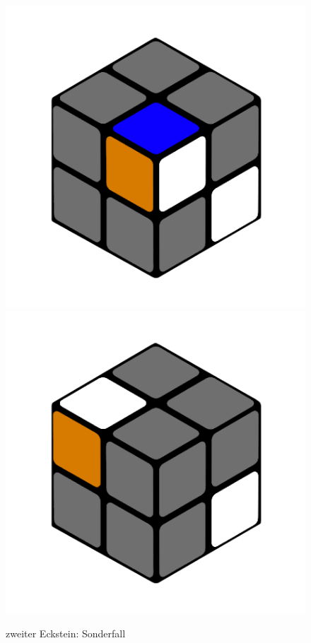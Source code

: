 \documentclass[12pt,a4paper, usenames, dvipsnames]{article}
\theoremstyle{mystyle}
\theoremstyle{definition}
\begin{document}
\begin{figure}[H]
\includegraphics[scale=0.1]{e1_s2_s3_s.png}
\includegraphics[scale=0.1]{e1_s2_s4_s.png}
\caption{zweiter Eckstein: Sonderfall}
\label{Abbildung_ZweiterEckstein2}
\end{figure}
\end{document}

